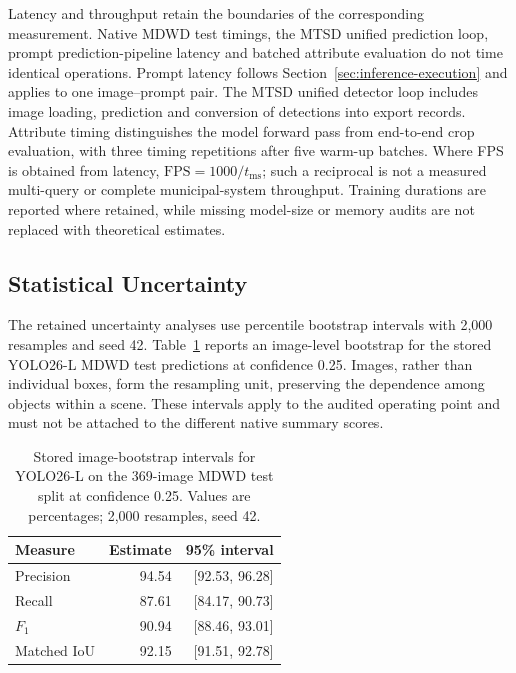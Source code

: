 Latency and throughput retain the boundaries of the corresponding measurement. Native \gls{MDWD} test timings, the \gls{MTSD} unified prediction loop, prompt prediction-pipeline latency and batched attribute evaluation do not time identical operations. Prompt latency follows Section~\ref{sec:inference-execution} and applies to one image--prompt pair. The \gls{MTSD} unified detector loop includes image loading, prediction and conversion of detections into export records. Attribute timing distinguishes the model forward pass from end-to-end crop evaluation, with three timing repetitions after five warm-up batches. Where FPS is obtained from latency, \(\mathrm{FPS}=1000/t_{\mathrm{ms}}\); such a reciprocal is not a measured multi-query or complete municipal-system throughput. Training durations are reported where retained, while missing model-size or memory audits are not replaced with theoretical estimates.

\subsection{Statistical Uncertainty}
\label{sec:ev-uncertainty}
The retained uncertainty analyses use percentile bootstrap intervals with 2,000 resamples and seed 42. Table~\ref{tab:ev-mdwd-ci} reports an image-level bootstrap for the stored YOLO26-L \gls{MDWD} test predictions at confidence 0.25. Images, rather than individual boxes, form the resampling unit, preserving the dependence among objects within a scene. These intervals apply to the audited operating point and must not be attached to the different native summary scores.

\begin{table}[htbp]
\centering
\small
\caption{Stored image-bootstrap intervals for YOLO26-L on the 369-image \gls{MDWD} test split at confidence 0.25. Values are percentages; 2,000 resamples, seed 42.}
\label{tab:ev-mdwd-ci}
\renewcommand{\arraystretch}{1.15}
\begin{tabularx}{\textwidth}{@{}>{\raggedright\arraybackslash}Xrr@{}}
\toprule
Measure & Estimate & 95\% interval \\
\midrule
Precision & 94.54 & [92.53, 96.28] \\
Recall & 87.61 & [84.17, 90.73] \\
$F_1$ & 90.94 & [88.46, 93.01] \\
Matched IoU & 92.15 & [91.51, 92.78] \\
\bottomrule
\end{tabularx}
\end{table}


